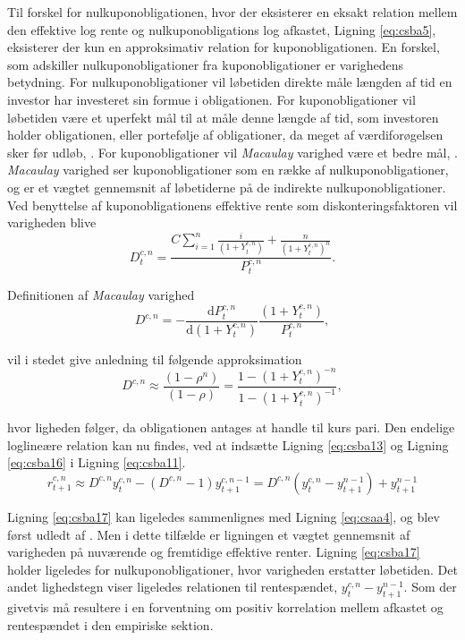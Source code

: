 \documentclass[
  a4paper,
  oneside]{memoir}
\begin{document}
Til forskel for nulkuponobligationen, hvor der eksisterer en eksakt relation mellem den effektive log rente og nulkuponobligations log afkastet, Ligning \eqref{eq:csba5}, eksisterer der kun en approksimativ relation for kuponobligationen. En forskel, som adskiller nulkuponobligationer fra kuponobligationer er varighedens betydning. For nulkuponobligationer vil løbetiden direkte måle længden af tid en investor har investeret sin formue i obligationen. For kuponobligationer vil løbetiden være et uperfekt mål til at måle denne længde af tid, som investoren holder obligationen, eller portefølje af obligationer, da meget af værdiforøgelsen sker før udløb, \citep{Campbell1997}. For kuponobligationer vil \emph{Macaulay} varighed være et bedre mål, \citep{Macaulay1938}. \emph{Macaulay} varighed ser kuponobligationer som en række af nulkuponobligationer, og er et vægtet gennemsnit af løbetiderne på de indirekte nulkuponobligationer. Ved benyttelse af kuponobligationens effektive rente som diskonteringsfaktoren vil varigheden blive
\begin{equation}
D_t^{c,n}=\frac{C\sum_{i=1}^n \frac{i}{(1+Y_t^{c,n})} + \frac{n}{(1+Y_t^{c,n})^n}}{P_t^{c,n}}. \label{eq:csba15}
\end{equation}

Definitionen af \emph{Macaulay} varighed
\[D^{c,n}=-\frac{\text{d} P_t^{c,n}}{\text{d} (1+Y_t^{c,n})}\frac{(1+Y_t^{c,n})}{P_t^{c,n}},\]

vil i stedet give anledning til følgende approksimation
\begin{equation}
D^{c,n}\approx \frac{(1-\rho^n)}{(1-\rho)} = \frac{1-(1+Y_t^{c,n})^{-n}}{1-(1+Y_t^{c,n})^{-1}}, \label{eq:csba16}
\end{equation}

hvor ligheden følger, da obligationen antages at handle til kurs pari. Den endelige loglineære relation kan nu findes, ved at indsætte Ligning \eqref{eq:csba13} og Ligning \eqref{eq:csba16} i Ligning \eqref{eq:csba11}.
\begin{equation}
r_{t+1}^{c,n}\approx D^{c,n} y_t^{c,n} - \left(D^{c,n} - 1\right) y_{t+1}^{c,n-1}=D^{c,n}(y_t^{c,n}- y_{t+1}^{n-1}) + y_{t+1}^{n-1}  \label{eq:csba17}
\end{equation}

Ligning \eqref{eq:csba17} kan ligeledes sammenlignes med Ligning \eqref{eq:csaa4}, og blev først udledt af \citep{Campbell1983}. Men i dette tilfælde er ligningen et vægtet gennemsnit af varigheden på nuværende og fremtidige effektive renter. Ligning \eqref{eq:csba17} holder ligeledes for nulkuponobligationer, hvor varigheden erstatter løbetiden. Det andet lighedstegn viser ligeledes relationen til rentespændet, \(y_t^{c,n}- y_{t+1}^{n-1}\). Som der givetvis må resultere i en forventning om positiv korrelation mellem afkastet og rentespændet i den empiriske sektion.
\end{document}
